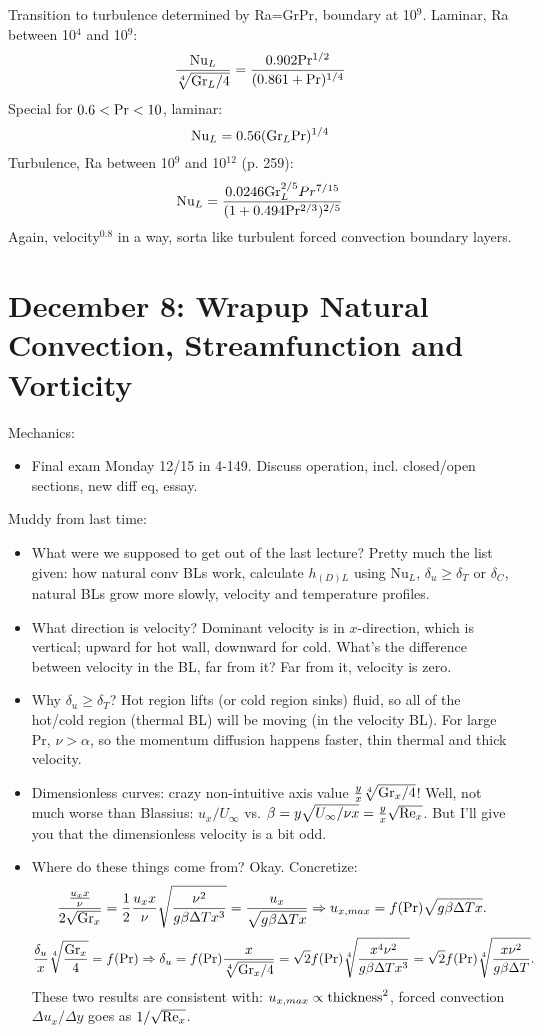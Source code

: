 \documentclass{report}
\begin{document}
Transition to turbulence determined by Ra=GrPr, boundary at 10$^9$.  Laminar,
Ra between 10$^4$ and 10$^9$:
$$\frac{{\rm Nu}_L}{\sqrt[4]{{\rm Gr}_L/4}} =
\frac{\rm 0.902 Pr^{1/2}}{\rm(0.861 + Pr)^{1/4}}$$
Special for $\rm0.6<Pr<10$, laminar:
$${\rm Nu}_L = 0.56({\rm Gr}_L{\rm Pr})^{1/4}$$
Turbulence, Ra between 10$^9$ and 10$^{12}$ (p. 259):
$${\rm Nu}_L = \frac{0.0246 {\rm Gr}_L^{2/5}Pr^{7/15}}
{\rm(1+0.494 Pr^{2/3})^{2/5}}$$
Again, velocity$^{0.8}$ in a way, sorta like turbulent forced convection
boundary layers.
\newpage


\section{December 8: Wrapup Natural Convection, Streamfunction and Vorticity}

Mechanics:
\begin{itemize}
\item Final exam Monday 12/15 in 4-149.  Discuss operation, incl. closed/open
  sections, new diff eq, essay.
\end{itemize}
Muddy from last time:
\begin{itemize}
\item What were we supposed to get out of the last lecture?  Pretty much the
  list given: how natural conv BLs work, calculate $h_{(D)L}$ using Nu$_L$,
  $\delta_u\geq\delta_T$ or $\delta_C$, natural BLs grow more slowly, velocity
  and temperature profiles.
\item What direction is velocity?  Dominant velocity is in $x$-direction, which
  is vertical; upward for hot wall, downward for cold.  What's the difference
  between velocity in the BL, far from it?  Far from it, velocity is zero.
\item Why $\delta_u\geq\delta_T$?  Hot region lifts (or cold region sinks)
  fluid, so all of the hot/cold region (thermal BL) will be moving (in the
  velocity BL).  For large Pr, $\nu>\alpha$, so the momentum diffusion happens
  faster, thin thermal and thick velocity.
\item Dimensionless curves: crazy non-intuitive axis value
  $\frac{y}{x}\sqrt[4]{{\rm Gr}_x/4}$!  Well, not much worse than Blassius:
  $u_x/U_\infty$ vs. $\beta=y\sqrt{U_\infty/\nu x}=\frac{y}{x}\sqrt{{\rm
      Re}_x}$.  But I'll give you that the dimensionless velocity is a bit odd.
\item Where do these things come from?  Okay.  Concretize:
  $$\frac{\frac{u_x x}{\nu}}{2\sqrt{{\rm Gr}_x}} =
  \frac{1}{2}\frac{u_x x}{\nu}\sqrt{\frac{\nu^2}{g\beta\Delta T x^3}} =
  \frac{u_x}{\sqrt{g\beta\Delta Tx}}\Rightarrow
  u_{x,max}=f({\rm Pr})\sqrt{g\beta\Delta T x}.$$
  $$\frac{\delta_u}{x}\sqrt[4]{\frac{{\rm Gr}_x}{4}}=f({\rm Pr}) \Rightarrow
  \delta_u = f({\rm Pr})\frac{x}{\sqrt[4]{{\rm Gr}_x/4}} =
  \sqrt{2}f({\rm Pr})\sqrt[4]{\frac{x^4\nu^2}{g\beta\Delta Tx^3}} =
  \sqrt{2}f({\rm Pr})\sqrt[4]{\frac{x\nu^2}{g\beta\Delta T}}.$$
  These two results are consistent with: $u_{x,max}\propto {\rm thickness}^2$,
  forced convection $\Delta u_x/\Delta y$ goes as $1/\sqrt{{\rm Re}_x}$.
\end{itemize}
\end{document}
